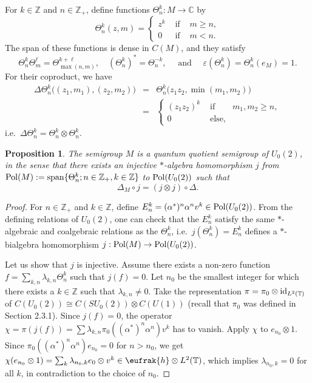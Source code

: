 \documentclass[12pt]{amsart}
\newtheorem{proposition}[theorem]{Proposition}
\theoremstyle{definition}
\theoremstyle{remark}
\numberwithin{equation}{section}
\begin{document}
For $k\in\mathbb{Z}$ and $n\in\mathbb{Z}_+$, define functions $\Theta^k_n:M\to
\mathbb{C}$ by
\[
\Theta^k_n(z,m) = \left\{\begin{array}{cll}
z^k & \mbox{ if }& m\ge n, \\
0  & \mbox{ if }& m < n.
\end{array}\right.
\]
The span of these functions is dense in $C(M)$, and they satisfy
\[
\Theta^k_n\Theta^\ell_m=\Theta^{k+\ell}_{\max(n,m)}, \quad (\Theta^k_n)^*=\Theta^{-k}_n, \quad\mbox{ and }\quad
\varepsilon(\Theta^k_n)=\Theta^k_n(e_M)=1.
\]
For their coproduct, we have
\begin{eqnarray*}
\Delta \Theta^k_n \big((z_1,m_1),(z_2,m_2)\big) &=&
\Theta_n^k\big(z_1z_2,\min(m_1,m_2)\big) \\
&=& \left\{\begin{array}{cll}
(z_1z_2)^k & \mbox{ if } & m_1,m_2\ge n, \\
0 & \mbox{ else},&
\end{array}\right.
\end{eqnarray*}
i.e.\ $\Delta \Theta^k_n=\Theta^k_n\otimes\Theta^k_n$.

\begin{proposition}
The semigroup $M$ is a quantum quotient semigroup of $U_0(2)$, in the sense
that there exists an injective $*$-algebra homomorphism $j$ from ${\rm Pol}(M)
:={\rm span}\{\Theta^k_n;n\in\mathbb{Z}_+,k\in\mathbb{Z}\}$ to ${\rm Pol}(U_0(2))$ such that
\[
\Delta_M\circ j = (j\otimes j)\circ \Delta.
\]
\end{proposition}
\begin{proof}
For $n\in\mathbb{Z}_+$ and $k\in\mathbb{Z}$, define $E^k_n=(\alpha^*)^n\alpha^nv^k\in {\rm Pol}(U_0(2))$. From 
the defining relations of $U_0(2)$, one can check that the $E^k_n$ satisfy the same $*$-algebraic and coalgebraic 
relations as the $\Theta_n^k$, i.e.\ $j(\Theta^k_n)=E_n^k$ defines a $*$-bialgebra homomorphism $j:{\rm 
Pol}(M)\to {\rm Pol}(U_0(2))$.

Let us show that $j$ is injective. Assume there exists a non-zero function $f=\sum_{k,n}
\lambda_{k,n}\Theta^k_n$ such that $j(f)=0$. Let $n_0$ be the smallest integer
  for which there exists a $k\in\mathbb{Z}$ such that
  $\lambda_{k,n}\not=0$. Take the representation $\pi=\pi_0\otimes{\rm id}_{L^2(\mathbb{T})}$ of
  $C(U_0(2))\cong C(SU_0(2))\otimes C(U(1))$ (recall that $\pi_0$ was defined in Section 2.3.1). Since $j(f)=0$, the operator
  $\chi=\pi(j(f))=\sum\lambda_{k,n}\pi_0\left((\alpha^*)^n\alpha^n\right)v^k$ has to
    vanish. Apply $\chi$ to $e_{n_0}\otimes 1$. Since
    $\pi_0\left((\alpha^*)^n\alpha^n\right)e_{n_0}=0$ for $n>n_0$, we get $\chi
      (e_{n_0}\otimes 1) = \sum_k \lambda_{n_0,k} e_0\otimes
      v^k\in\eufrak{h}\otimes L^2(\mathbb{T})$, which implies
      $\lambda_{n_0,k}=0$ for all $k$, in contradiction to the choice of $n_0$. 
\end{proof}
\end{document}
